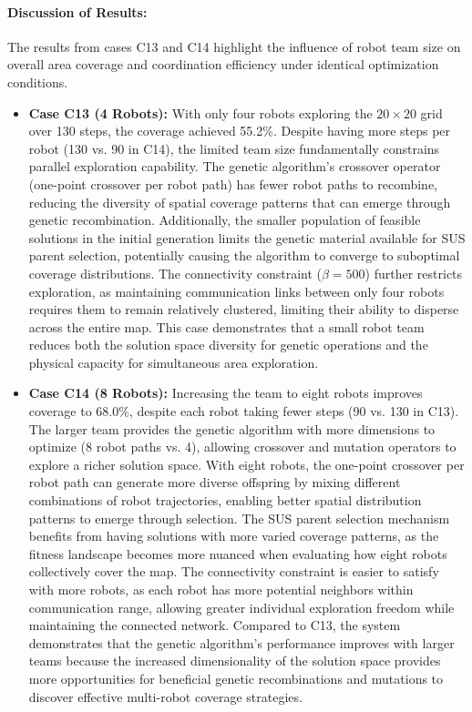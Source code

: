 \paragraph{Discussion of Results:}
The results from cases C13 and C14 highlight the influence of robot team size on overall area coverage and coordination efficiency under identical optimization conditions.
\begin{itemize}
    \item \textbf{Case C13 (4 Robots):}  
    With only four robots exploring the $20 \times 20$ grid over 130 steps, the coverage achieved 55.2\%. 
    Despite having more steps per robot (130 vs. 90 in C14), the limited team size fundamentally constrains parallel exploration capability.
    The genetic algorithm's crossover operator (one-point crossover per robot path) has fewer robot paths to recombine, reducing the diversity of spatial coverage patterns that can emerge through genetic recombination.
    Additionally, the smaller population of feasible solutions in the initial generation limits the genetic material available for SUS parent selection, potentially causing the algorithm to converge to suboptimal coverage distributions.
    The connectivity constraint ($\beta=500$) further restricts exploration, as maintaining communication links between only four robots requires them to remain relatively clustered, limiting their ability to disperse across the entire map.
    This case demonstrates that a small robot team reduces both the solution space diversity for genetic operations and the physical capacity for simultaneous area exploration.
    
    \item \textbf{Case C14 (8 Robots):}  
    Increasing the team to eight robots improves coverage to 68.0\%, despite each robot taking fewer steps (90 vs. 130 in C13).
    The larger team provides the genetic algorithm with more dimensions to optimize (8 robot paths vs. 4), allowing crossover and mutation operators to explore a richer solution space.
    With eight robots, the one-point crossover per robot path can generate more diverse offspring by mixing different combinations of robot trajectories, enabling better spatial distribution patterns to emerge through selection.
    The SUS parent selection mechanism benefits from having solutions with more varied coverage patterns, as the fitness landscape becomes more nuanced when evaluating how eight robots collectively cover the map.
    The connectivity constraint is easier to satisfy with more robots, as each robot has more potential neighbors within communication range, allowing greater individual exploration freedom while maintaining the connected network.
    Compared to C13, the system demonstrates that the genetic algorithm's performance improves with larger teams because the increased dimensionality of the solution space provides more opportunities for beneficial genetic recombinations and mutations to discover effective multi-robot coverage strategies.
\end{itemize}

